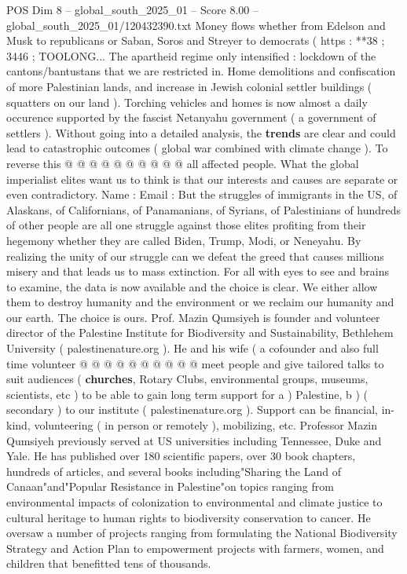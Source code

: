 \begin{textsample}{POS Dim 8 – global\_south\_2025\_01 – Score 8.00 – global\_south\_2025\_01/120432390.txt}
Money flows whether from Edelson and Musk to republicans or Saban, Soros and Streyer to democrats ( https : **38 ; 3446 ; TOOLONG...
The apartheid regime only intensified : lockdown of the cantons/bantustans that we are restricted in.
Home demolitions and confiscation of more Palestinian lands, and increase in Jewish colonial settler buildings ( squatters on our land ).
Torching vehicles and homes is now almost a daily occurence supported by the fascist Netanyahu government ( a government of settlers ).
Without going into a detailed analysis, the \textbf{trends} are clear and could lead to catastrophic outcomes ( global war combined with climate change ).
To reverse this @ @ @ @ @ @ @ @ @ @ all affected people.
What the global imperialist elites want us to think is that our interests and causes are separate or even contradictory.
Name : Email : But the struggles of immigrants in the US, of Alaskans, of Californians, of Panamanians, of Syrians, of Palestinians of hundreds of other people are all one struggle against those elites profiting from their hegemony whether they are called Biden, Trump, Modi, or Neneyahu.
By realizing the unity of our struggle can we defeat the greed that causes millions misery and that leads us to mass extinction.
For all with eyes to see and brains to examine, the data is now available and the choice is clear.
We either allow them to destroy humanity and the environment or we reclaim our humanity and our earth.
The choice is ours.
Prof.
Mazin Qumsiyeh is founder and volunteer director of the Palestine Institute for Biodiversity and Sustainability, Bethlehem University ( palestinenature.org ).
He and his wife ( a cofounder and also full time volunteer @ @ @ @ @ @ @ @ @ @ meet people and give tailored talks to suit audiences ( \textbf{churches}, Rotary Clubs, environmental groups, museums, scientists, etc ) to be able to gain long term support for a ) Palestine, b ) ( secondary ) to our institute ( palestinenature.org ).
Support can be financial, in-kind, volunteering ( in person or remotely ), mobilizing, etc.
Professor Mazin Qumsiyeh previously served at US universities including Tennessee, Duke and Yale.
He has published over 180 scientific papers, over 30 book chapters, hundreds of articles, and several books including"Sharing the Land of Canaan"and"Popular Resistance in Palestine"on topics ranging from environmental impacts of colonization to environmental and climate justice to cultural heritage to human rights to biodiversity conservation to cancer.
He oversaw a number of projects ranging from formulating the National Biodiversity Strategy and Action Plan to empowerment projects with farmers, women, and children that benefitted tens of thousands.

\end{textsample}
